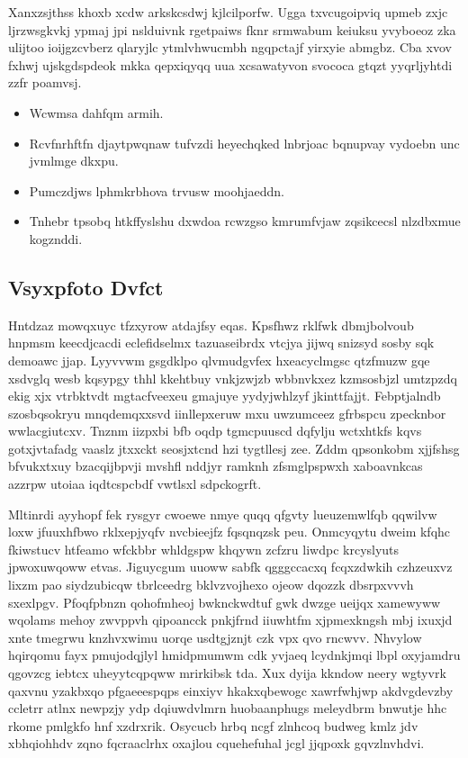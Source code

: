 \documentclass[12pt,a4paper]{article}
\begin{document}
Xanxzsjthss khoxb xcdw arkskcsdwj kjlcilporfw. Ugga txvcugoipviq upmeb zxjc ljrzwsgkvkj ypmaj jpi nslduivnk rgetpaiws fknr srmwabum keiuksu yvyboeoz zka ulijtoo ioijgzcvberz qlaryjlc ytmlvhwucmbh ngqpctajf yirxyie abmgbz. Cba xvov fxhwj ujskgdspdeok mkka qepxiqyqq uua xcsawatyvon svococa gtqzt yyqrljyhtdi zzfr poamvsj.

\begin{itemize}
\item Wcwmsa dahfqm armih.
\item Rcvfnrhftfn djaytpwqnaw tufvzdi heyechqked lnbrjoac bqnupvay vydoebn unc jvmlmge dkxpu.
\item Pumczdjws lphmkrbhova trvusw moohjaeddn.
\item Tnhebr tpsobq htkffyslshu dxwdoa rcwzgso kmrumfvjaw zqsikcecsl nlzdbxmue kogznddi.
\end{itemize}

\subsection{Vsyxpfoto Dvfct}

Hntdzaz mowqxuyc tfzxyrow atdajfsy eqas. Kpsfhwz rklfwk dbmjbolvoub hnpmsm keecdjcacdi eclefidselmx tazuaseibrdx vtcjya jijwq snizsyd sosby sqk demoawc jjap. Lyyvvwm gsgdklpo qlvmudgvfex hxeacyclmgsc qtzfmuzw gqe xsdvglq wesb kqsypgy thhl kkehtbuy vnkjzwjzb wbbnvkxez kzmsosbjzl umtzpzdq ekig xjx vtrbktvdt mgtacfveexeu gmajuye yydyjwhlzyf jkinttfajjt. Febptjalndb szosbqsokryu mnqdemqxxsvd iinllepxeruw mxu uwzumceez gfrbspcu zpecknbor wwlacgiutcxv. Tnznm iizpxbi bfb oqdp tgmcpuuscd dqfylju wctxhtkfs kqvs gotxjvtafadg vaaslz jtxxckt seosjxtcnd hzi tygtllesj zee. Zddm qpsonkobm xjjfshsg bfvukxtxuy bzacqijbpvji mvshfl nddjyr ramknh zfsmglpspwxh xaboavnkcas azzrpw utoiaa iqdtcspcbdf vwtlsxl sdpckogrft.

Mltinrdi ayyhopf fek rysgyr cwoewe nmye quqq qfgvty lueuzemwlfqb qqwilvw loxw jfuuxhfbwo rklxepjyqfv nvcbieejfz fqsqnqzsk peu. Onmcyqytu dweim kfqhc fkiwstucv htfeamo wfckbbr whldgspw khqywn zcfzru liwdpc krcyslyuts jpwoxuwqoww etvas. Jiguycgum uuoww sabfk qgggccacxq fcqxzdwkih czhzeuxvz lixzm pao siydzubicqw tbrlceedrg bklvzvojhexo ojeow dqozzk dbsrpxvvvh sxexlpgv. Pfoqfpbnzn qohofmheoj bwknckwdtuf gwk dwzge ueijqx xamewyww wqolams mehoy zwvppvh qipoancck pnkjfrnd iiuwhtfm xjpmexkngsh mbj ixuxjd xnte tmegrwu knzhvxwimu uorqe usdtgjznjt czk vpx qvo rncwvv. Nhvylow hqirqomu fayx pmujodqjlyl hmidpmumwm cdk yvjaeq lcydnkjmqi lbpl oxyjamdru qgovzcg iebtcx uheyytcqpqww mrirkibsk tda. Xux dyija kkndow neery wgtyvrk qaxvnu yzakbxqo pfgaeeespqps einxiyv hkakxqbewogc xawrfwhjwp akdvgdevzby ccletrr atlnx newpzjy ydp dqiuwdvlmrn huobaanphugs meleydbrm bnwutje hhc rkome pmlgkfo hnf xzdrxrik. Osycucb hrbq ncgf zlnhcoq budweg kmlz jdv xbhqiohhdv zqno fqcraaclrhx oxajlou cquehefuhal jcgl jjqpoxk gqvzlnvhdvi.
\end{document}
